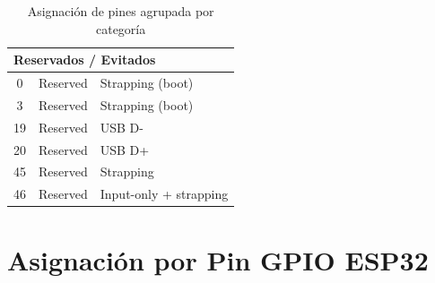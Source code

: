 \documentclass[9pt,a4paper,twocolumn,twoside]{rho-class/rho}
\begin{document}
\begin{table}[H]
{\begin{tabular}{ccl}
\midrule
\multicolumn{3}{l}{\textbf{Reservados / Evitados}} \\
\midrule
0  & Reserved & Strapping (boot) \\
3  & Reserved & Strapping (boot) \\
19 & Reserved & USB D- \\
20 & Reserved & USB D+ \\
45 & Reserved & Strapping \\
46 & Reserved & Input-only + strapping \\
\bottomrule
\end{tabular}
}
\caption{Asignación de pines agrupada por categoría}
\end{table}

\section{Asignación por Pin GPIO ESP32}
\end{document}
